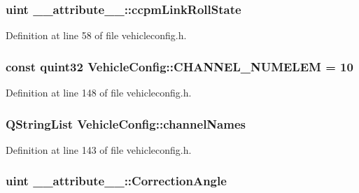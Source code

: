\hypertarget{group___config_plugin_gaecc16f8488db13ba16c2c6e1d0053239}{
\subsubsection[{ccpm\-Link\-Roll\-State}]{\setlength{\rightskip}{0pt plus 5cm}uint \-\_\-\-\_\-attribute\-\_\-\-\_\-\-::ccpm\-Link\-Roll\-State}}\label{group___config_plugin_gaecc16f8488db13ba16c2c6e1d0053239}


Definition at line 58 of file vehicleconfig.\-h.

\hypertarget{group___config_plugin_ga1d29d6e305c146323af055bb3657059f}{
\subsubsection[{C\-H\-A\-N\-N\-E\-L\-\_\-\-N\-U\-M\-E\-L\-E\-M}]{\setlength{\rightskip}{0pt plus 5cm}const quint32 Vehicle\-Config\-::\-C\-H\-A\-N\-N\-E\-L\-\_\-\-N\-U\-M\-E\-L\-E\-M = 10\hspace{0.3cm}{\ttfamily [static]}}}\label{group___config_plugin_ga1d29d6e305c146323af055bb3657059f}


Definition at line 148 of file vehicleconfig.\-h.

\hypertarget{group___config_plugin_gaca881ae0a25d7e063b68a36b2f5576bf}{
\subsubsection[{channel\-Names}]{\setlength{\rightskip}{0pt plus 5cm}Q\-String\-List Vehicle\-Config\-::channel\-Names}}\label{group___config_plugin_gaca881ae0a25d7e063b68a36b2f5576bf}


Definition at line 143 of file vehicleconfig.\-h.

\hypertarget{group___config_plugin_ga9540a6905aee7cc229adfd3bd687b86a}{
\subsubsection[{Correction\-Angle}]{\setlength{\rightskip}{0pt plus 5cm}uint \-\_\-\-\_\-attribute\-\_\-\-\_\-\-::\-Correction\-Angle}}\label{group___config_plugin_ga9540a6905aee7cc229adfd3bd687b86a}


